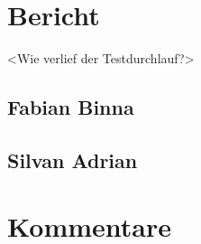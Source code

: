 \documentclass[11pt]{scrartcl}
\begin{document}
\section{Bericht}

<Wie verlief der Testdurchlauf?>

\subsection{Fabian Binna}

\subsection{Silvan Adrian}

\section{Kommentare}
\end{document}
